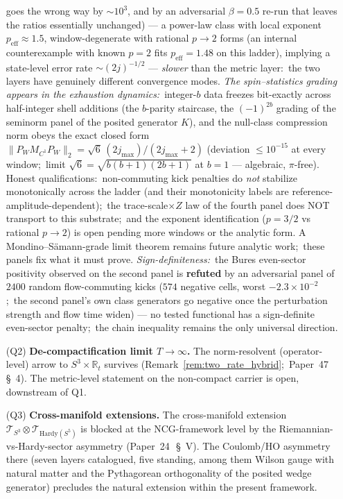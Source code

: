 \documentclass[11pt,a4paper]{article}
\theoremstyle{plain}
\theoremstyle{definition}
\newcommand{\sthree}{S^{3}}
\newcommand{\Tcal}{\mathcal{T}}
\newcommand{\R}{\mathbb{R}}
\begin{document}
\begin{enumerate}
goes the wrong way by $\sim 10^{3}$, and by an adversarial
$\beta = 0.5$ re-run that leaves the ratios essentially unchanged) —
a power-law class with local exponent $p_{\mathrm{eff}} \approx 1.5$,
window-degenerate with rational $p \to 2$ forms (an internal
counterexample with known $p = 2$ fits $p_{\mathrm{eff}} = 1.48$ on
this ladder), implying a state-level error rate $\sim
(2j)^{-1/2}$ — \emph{slower} than the metric layer:\ the two layers
have genuinely different convergence modes. \emph{The
spin–statistics grading appears in the exhaustion dynamics:}\
integer-$b$ data freezes bit-exactly across half-integer shell
additions (the $b$-parity staircase, the $(-1)^{2b}$ grading of the
seminorm panel of the posited generator $K$), and the null-class compression norm obeys the
exact closed form $\|P_{W} M_{C^{1}} P_{W}\|_{2} = \sqrt{6}\,
(2j_{\max})/(2j_{\max}+2)$ (deviation $\le 10^{-15}$ at every window;\
limit $\sqrt{6} = \sqrt{b(b+1)(2b+1)}$ at $b = 1$ — algebraic,
$\pi$-free). Honest qualifications:\ non-commuting kick penalties do
\emph{not} stabilize monotonically across the ladder (and their
monotonicity labels are reference-amplitude-dependent);\ the
trace-scale$\times Z$ law of the fourth panel does NOT transport to
this substrate;\ and the exponent identification ($p = 3/2$ vs
rational $p \to 2$) is open pending more windows or the analytic
form. A Mondino--S\"amann-grade limit theorem remains future
analytic work;\ these panels fix what it must prove. \emph{Sign-definiteness:}\ the
Bures even-sector positivity observed on the second panel is
\textbf{refuted} by an adversarial panel of $2400$ random
flow-commuting kicks ($574$ negative cells, worst $-2.3{\times}
10^{-2}$;\ the second panel's own class generators go negative once
the perturbation strength and flow time widen) — no tested functional
has a sign-definite even-sector penalty;\ the chain inequality
remains the only universal direction.

\item[(Q2)] \textbf{De-compactification limit $T \to \infty$.} The
norm-resolvent (operator-level) arrow to $\sthree \times \R_{t}$
survives (Remark~\ref{rem:two_rate_hybrid};\
Paper~47~\cite{paper47}\,\S~4). The metric-level statement on the
non-compact carrier is open, downstream of Q1.

\item[(Q3)] \textbf{Cross-manifold extensions.} The cross-manifold
extension $\Tcal_{\sthree} \otimes \Tcal_{\mathrm{Hardy}(S^{5})}$ is
blocked at the NCG-framework level by the
Riemannian-vs-Hardy-sector asymmetry (Paper~24~\cite{paper24}\,\S~V).
The Coulomb/HO asymmetry there (seven layers catalogued, five standing,
among them Wilson gauge with natural matter and the
Pythagorean orthogonality of the posited wedge generator) precludes the natural extension
within the present framework.


\end{enumerate}
\end{document}
